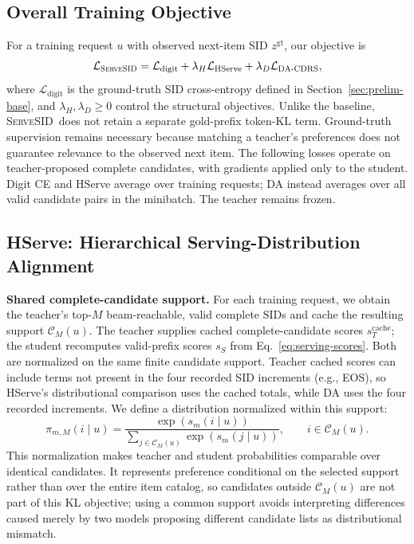 \documentclass[sigconf, anonymous, review]{acmart}
\newcommand{\method}{\textsc{ServeSID}}
\newcommand{\C}{\mathcal{C}}
\begin{document}


\subsection{Overall Training Objective}
\label{sec:method-total}

For a training request $u$ with observed next-item SID
$z^{\mathrm{gt}}$, our objective is
\begin{equation}
\mathcal L_{\mathrm{\method}}
=\mathcal L_{\mathrm{digit}}
+\lambda_H\mathcal L_{\mathrm{HServe}}
+\lambda_D\mathcal L_{\mathrm{DA\text{-}CDRS}},
\label{eq:total}
\end{equation}
where $\mathcal L_{\mathrm{digit}}$ is the ground-truth SID
cross-entropy defined in Section~\ref{sec:prelim-base}, and
$\lambda_H,\lambda_D\ge0$ control the structural objectives. Unlike
the baseline, \method\ does not retain a separate gold-prefix
token-KL term. Ground-truth supervision remains necessary because
matching a teacher's preferences does not guarantee relevance to the
observed next item. The following losses operate on teacher-proposed
complete candidates, with gradients applied only to the student.
Digit CE and HServe average over training requests; DA instead averages over all valid candidate pairs in the minibatch. The teacher remains frozen.

\subsection{HServe: Hierarchical Serving-Distribution Alignment}
\label{sec:method-hserve}

\textbf{Shared complete-candidate support.} For each training
request, we obtain the teacher's top-$M$ beam-reachable, valid
complete SIDs and cache the resulting support $\C_M(u)$. The teacher supplies cached complete-candidate scores
$s_T^{\mathrm{cache}}$; the student recomputes valid-prefix scores
$s_S$ from Eq.~\ref{eq:serving-scores}. Both are normalized on the
same finite candidate support. Teacher cached scores can include
terms not present in the four recorded SID increments (e.g., EOS),
so HServe's distributional comparison uses the cached totals,
while DA uses the four recorded increments. We define a distribution normalized within
this support:
\begin{equation}
\pi_{m,M}(i\mid u)=
\frac{\exp(s_m(i\mid u))}
{\sum_{j\in\C_M(u)}\exp(s_m(j\mid u))},
\qquad i\in\C_M(u).
\label{eq:item-dist}
\end{equation}
This normalization makes teacher and student probabilities comparable
over identical candidates. It represents preference
conditional on the selected support rather than over the entire item
catalog, so candidates outside $\C_M(u)$ are not part of this KL
objective; using a common support avoids interpreting differences
caused merely by two models proposing different candidate lists as
distributional mismatch.
\end{document}
